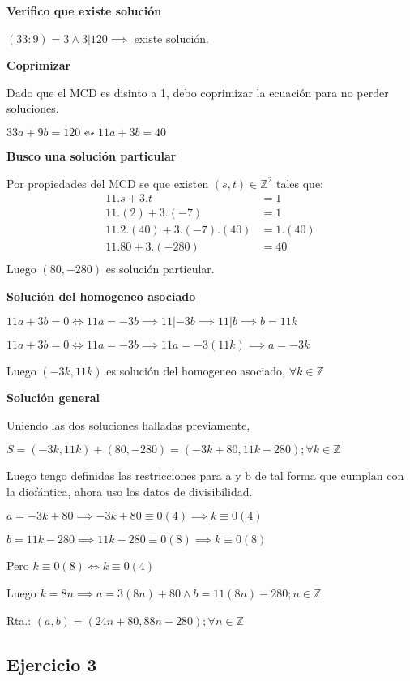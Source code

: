 \textbf{Verifico que existe solución}

$ (33:9) = 3 \wedge 3|120 \implies $ existe solución.

\textbf{Coprimizar}

Dado que el MCD es disinto a 1, debo coprimizar la ecuación para no perder soluciones.

$ 33a+9b = 120 \leftrightsquigarrow 11a+3b=40$

\textbf{Busco una solución particular}

Por propiedades del MCD se que existen $ (s,t) \in \mathbb{Z}^2 $ tales que:
\begin{align*}
    11.s + 3.t &= 1 \\
    11.(2) + 3.(-7) &= 1 \\
    11.2.(40) + 3.(-7).(40) &= 1.(40) \\
    11.80 + 3.(-280) &= 40 \\
\end{align*}
Luego $ (80,-280) $ es solución particular.

\textbf{Solución del homogeneo asociado}

$ 11a +3b = 0 \iff 11a = -3b \implies 11|-3b \implies 11|b \implies b=11k $

$ 11a +3b = 0 \iff 11a = -3b \implies 11a = -3(11k) \implies a = -3k $

Luego $ (-3k,11k) $ es solución del homogeneo asociado, $ \forall k \in \mathbb{Z} $

\textbf{Solución general}

Uniendo las dos soluciones halladas previamente,

$ S = (-3k,11k) + (80,-280) = (-3k+80, 11k-280); \forall k \in \mathbb{Z} $

Luego tengo definidas las restricciones para a y b de tal forma que cumplan con la diofántica, ahora uso los datos de divisibilidad.

$ a = -3k+80 \implies -3k+80 \equiv 0(4) \implies k \equiv 0(4)$

$ b = 11k-280 \implies 11k-280 \equiv 0(8) \implies k \equiv 0(8)$

Pero $ k \equiv 0(8) \iff k \equiv 0(4) $

Luego $ k = 8n \implies a = 3(8n) + 80 \wedge b=11(8n)-280; n \in \mathbb{Z}$

Rta.: $ (a,b) = (24n+80, 88n-280); \forall n \in \mathbb{Z} $

\subsection{Ejercicio 3}




